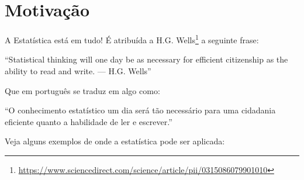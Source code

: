 \documentclass[12pt,]{style/krantz}
\renewenvironment{quote}{\begin{VF}}{\end{VF}}
\renewcommand{\href}[2]{#2\footnote{\url{#1}}}
\theoremstyle{definition}
\theoremstyle{definition}
\theoremstyle{definition}
\theoremstyle{remark}
\begin{document}
\section*{Motivação}\label{motivacao}


A Estatística está em tudo! É atribuída a
\href{https://www.sciencedirect.com/science/article/pii/0315086079901010}{H.G.
Wells} a seguinte frase:

\begin{quote}
``Statistical thinking will one day be as necessary for efficient
citizenship as the ability to read and write. --- H.G. Wells''
\end{quote}

Que em português se traduz em algo como:

\begin{quote}
``O conhecimento estatístico um dia será tão necessário para uma
cidadania eficiente quanto a habilidade de ler e escrever.''
\end{quote}

Veja alguns exemplos de onde a estatística pode ser aplicada:
\end{document}
